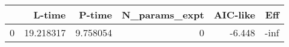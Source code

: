 \begin{tabular}{lrrrrr}
\toprule
{} &     L-time &    P-time &  N\_params\_expt &  AIC-like &  Eff \\
\midrule
0 &  19.218317 &  9.758054 &              0 &    -6.448 & -inf \\
\bottomrule
\end{tabular}
